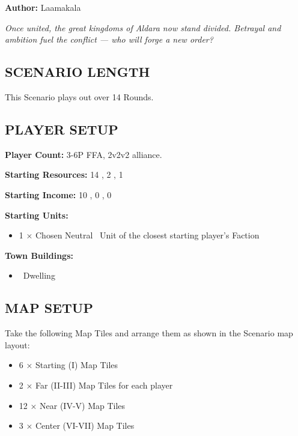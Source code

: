 
\begin{multicols*}{2}

\textbf{Author:} Laamakala

\textit{Once united, the great kingdoms of Aldara now stand divided. Betrayal and ambition fuel the conflict — who will forge a new order?}  %

\subsection*{\MakeUppercase{Scenario Length}}
This Scenario plays out over 14 Rounds.

\subsection*{\MakeUppercase{Player Setup}}
\textbf{Player Count:} 3-6P FFA, 2v2v2 alliance.

\textbf{Starting Resources:} 14 , 2 , 1 

\textbf{Starting Income:} 10 , 0 , 0 

\textbf{Starting Units:}

\begin{itemize}
  \item 1 × Chosen Neutral \bronze\ Unit of the closest starting player's Faction
\end{itemize}

\textbf{Town Buildings:}
\begin{itemize}
  \item \bronze\ Dwelling
\end{itemize}

\subsection*{\MakeUppercase{Map Setup}}
Take the following Map Tiles and arrange them as shown in the Scenario map layout:

\begin{itemize}
  \item 6 × Starting (I) Map Tiles
  \item 2 × Far (II-III) Map Tiles for each player
  \item 12 × Near (IV-V) Map Tiles
  \item 3 × Center (VI-VII) Map Tiles
\end{itemize}


\end{multicols*}
